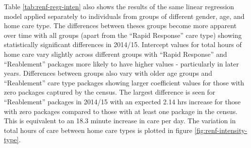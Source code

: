 \documentclass[]{article}
\begin{document}
Table \ref{tab:renf-regr-inten} also shows the results of the same
linear regression model applied separately to individuals from groups of
different gender, age, and home care type. The differences between
theses groups become more apparent over time with all groups (apart from
the ``Rapid Response'' care type) showing statistically significant
differences in 2014/15. Intercept values for total hours of home care
vary slightly across different groups with ``Rapid Response'' and
``Reablement'' packages more likely to have higher values - particularly
in later years. Differences between groups also vary with older age
groups and ``Reablement'' care type packages showing larger coefficient
values for those with zero packages captured by the census. The largest
difference is seen for ``Reablement'' packages in 2014/15 with an
expected 2.14 hrs increase for those with zero packages compared to
those with at least one package in the census. This is equivalent to an
18.3 minute increase in care per day. The variation in total hours of
care between home care types is plotted in figure
\ref{fig:renf-intensity-type}.
\end{document}
